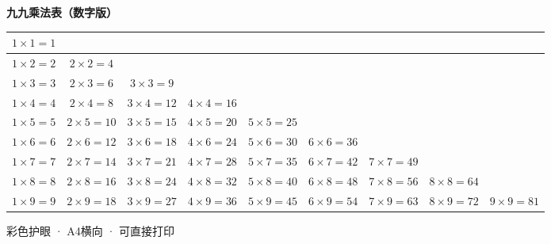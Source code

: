 \documentclass[a4paper,12pt,UTF8]{ctexart}
\begin{document}
\centering
\vspace*{5mm}

{\Huge\bfseries 九九乘法表（数字版）}\\[1em]

\renewcommand{\arraystretch}{1.8}
\large

\begin{tabular}{|c|c|c|c|c|c|c|c|c|}
\hline
\rowcolor{row1} $1\times1=1$ & & & & & & & & \\
\hline
\rowcolor{row2} $1\times2=2$ & $2\times2=4$ & & & & & & & \\
\hline
\rowcolor{row3} $1\times3=3$ & $2\times3=6$ & $3\times3=9$ & & & & & & \\
\hline
\rowcolor{row1} $1\times4=4$ & $2\times4=8$ & $3\times4=12$ & $4\times4=16$ & & & & & \\
\hline
\rowcolor{row2} $1\times5=5$ & $2\times5=10$ & $3\times5=15$ & $4\times5=20$ & $5\times5=25$ & & & & \\
\hline
\rowcolor{row3} $1\times6=6$ & $2\times6=12$ & $3\times6=18$ & $4\times6=24$ & $5\times6=30$ & $6\times6=36$ & & & \\
\hline
\rowcolor{row1} $1\times7=7$ & $2\times7=14$ & $3\times7=21$ & $4\times7=28$ & $5\times7=35$ & $6\times7=42$ & $7\times7=49$ & & \\
\hline
\rowcolor{row2} $1\times8=8$ & $2\times8=16$ & $3\times8=24$ & $4\times8=32$ & $5\times8=40$ & $6\times8=48$ & $7\times8=56$ & $8\times8=64$ & \\
\hline
\rowcolor{row3} $1\times9=9$ & $2\times9=18$ & $3\times9=27$ & $4\times9=36$ & $5\times9=45$ & $6\times9=54$ & $7\times9=63$ & $8\times9=72$ & $9\times9=81$ \\
\hline
\end{tabular}

\vspace{1cm}
\small 彩色护眼 · A4横向 · 可直接打印
\end{document}
